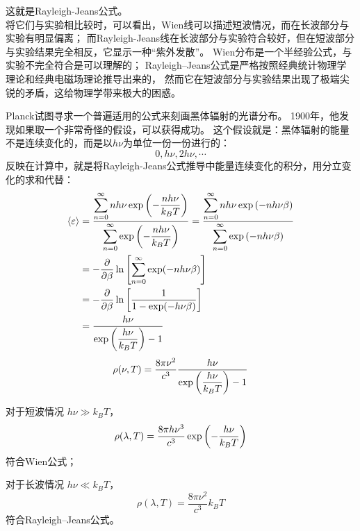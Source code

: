 这就是Rayleigh-Jeans公式。\\

将它们与实验相比较时，可以看出，Wien线可以描述短波情况，而在长波部分与实验有明显偏离；
而Rayleigh-Jeans线在长波部分与实验符合较好，但在短波部分与实验结果完全相反，它显示一种“紫外发散”。
Wien分布是一个半经验公式，与实验不完全符合是可以理解的；
Rayleigh--Jeans公式是严格按照经典统计物理学理论和经典电磁场理论推导出来的，
然而它在短波部分与实验结果出现了极端尖锐的矛盾，这给物理学带来极大的困惑。

Planck试图寻求一个普遍适用的公式来刻画黑体辐射的光谱分布。
1900年，他发现如果取一个非常奇怪的假设，可以获得成功。
这个假设就是：黑体辐射的能量不是连续变化的，而是以$ h\nu $为单位一份一份进行的：
\begin{equation}
0, h\nu, 2h\nu, \cdots
\end{equation}
反映在计算中，就是将Rayleigh-Jeans公式推导中能量连续变化的积分，用分立变化的求和代替：
\begin{align}
\ev{\varepsilon} &= \dfrac{\displaystyle
    \sum_{n=0}^\infty n h \nu \exp\qty(-\dfrac{n h\nu}{k_B T})}{\displaystyle
    \sum_{n=0}^\infty \exp\qty(-\dfrac{n h\nu}{k_B T})} 
= \dfrac{\displaystyle
    \sum_{n=0}^\infty n h \nu \exp\qty(-n h\nu\beta)}{\displaystyle
    \sum_{n=0}^\infty \exp\qty(-n h\nu\beta)} \notag\\
&= -\pdv{\beta} \ln \qty[\sum_{n=0}^\infty \exp(-n h\nu\beta)]  \notag\\
&= -\pdv{\beta} \ln \qty[\dfrac{1}{1 - \exp(-h\nu\beta)}]\notag\\
&= \dfrac{h\nu}{\exp\qty(\dfrac{h\nu}{k_B T}) - 1}
\end{align}
\begin{equation}
\rho(\nu, T) = \dfrac{8\pi\nu^2}{c^3} \dfrac{h\nu}{\exp\qty(\dfrac{h\nu}{k_B T}) - 1}
\end{equation}

对于短波情况 $ h\nu \gg k_B T $，
\begin{equation}
\rho(\lambda, T) = \dfrac{8\pi h\nu^3}{c^3} \exp\qty(-\dfrac{h\nu}{k_B T})
\end{equation}
符合Wien公式；

对于长波情况 $ h\nu \ll k_B T $，
\begin{equation}
\rho(\lambda, T) = \dfrac{8\pi \nu^2}{c^3} k_B T
\end{equation}
符合Rayleigh--Jeans公式。

